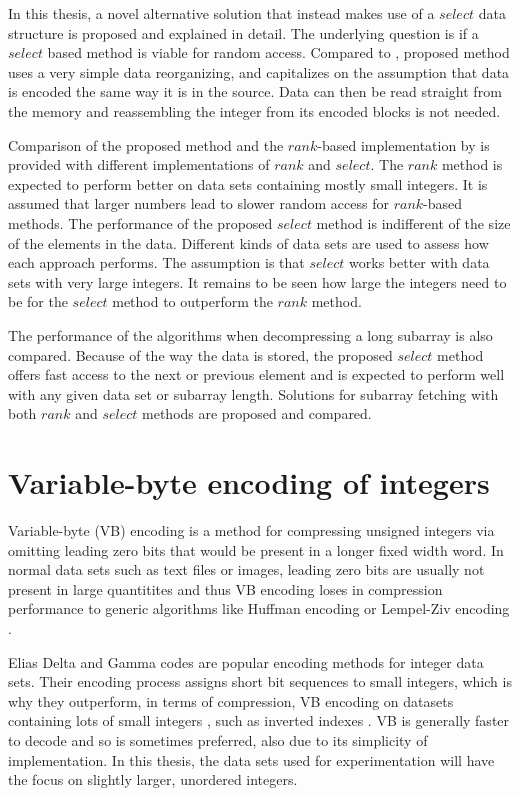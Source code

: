 In this thesis, a novel alternative solution that instead makes use of a $select$ data structure is proposed and explained in detail. The underlying question is if a $select$ based method is viable for random 
access. Compared to \citeauthor{Bri09}, proposed method uses a very simple data 
reorganizing, and capitalizes on the assumption that data is encoded the same way it is in the source. Data can then be read straight from the memory and reassembling the integer from 
its encoded blocks is not needed.

Comparison of the proposed method and the $rank$-based implementation by \citeauthor{Bri09} is provided with different implementations of $rank$ and $select$. The $rank$ method 
is expected to perform better on data sets containing mostly small integers. It is assumed that larger numbers lead to slower random access for $rank$-based methods. 
The performance of the proposed $select$ method is indifferent 
of the size of the elements in the data. Different kinds of data sets are used to assess how each approach performs. The assumption is that $select$ works better with data sets with very large integers. It
remains to be seen how large the integers need to be for the $select$ method to outperform the $rank$ method.

The performance of the algorithms when decompressing a long subarray is also compared. Because of the way the data is stored, the proposed $select$ method offers fast access to the next or previous element 
and is expected to perform well with any given data set or subarray length. Solutions for subarray fetching with both $rank$ and $select$ methods are proposed and compared. 


\chapter{Variable-byte encoding of integers}

Variable-byte (VB) encoding \citep{Mid96, Wil99} is a method for compressing unsigned integers via omitting leading zero bits that would be present in a longer fixed 
width word. In normal data sets such as text files or images, leading zero bits are usually not present in large quantitites and thus VB encoding loses in compression performance to generic algorithms 
like Huffman encoding \citep{Huf52} or Lempel-Ziv encoding \citep{Ziv77}. 

Elias Delta and Gamma codes \citep{Eli75} are popular encoding methods for integer data sets. Their encoding process assigns short bit sequences to small integers, 
which is why they outperform, in terms of compression, VB encoding on datasets containing lots of small integers \citep{Wil99}, such as inverted indexes \citep{Anh05, Pib19}. VB is generally faster 
to decode \citep{Wil99, Tro03} and so is sometimes preferred, also due to its simplicity of implementation. In this thesis, the data sets used for experimentation will have the focus on slightly larger, 
unordered integers. 


